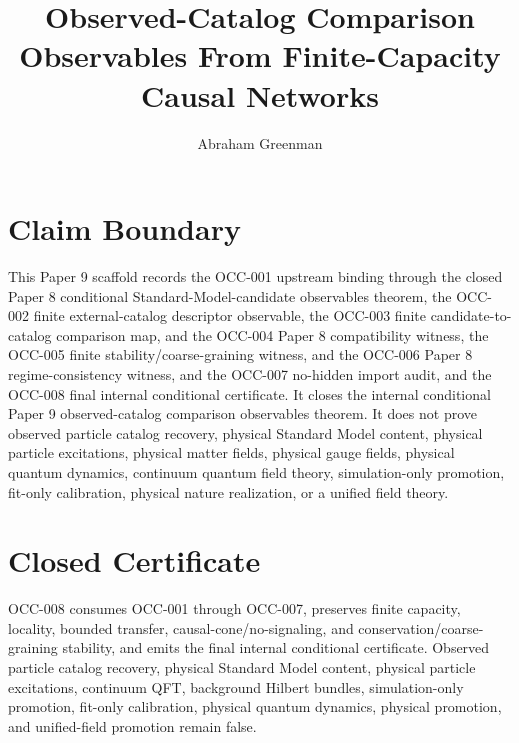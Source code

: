\documentclass{article}
\title{Observed-Catalog Comparison Observables From Finite-Capacity Causal Networks}
\author{Abraham Greenman}
\date{}
\begin{document}
\maketitle

\section{Claim Boundary}

This Paper 9 scaffold records the OCC-001 upstream binding through the closed
Paper 8 conditional Standard-Model-candidate observables theorem, the
OCC-002 finite external-catalog descriptor observable, the OCC-003 finite
candidate-to-catalog comparison map, and the OCC-004 Paper 8 compatibility
witness, the OCC-005 finite stability/coarse-graining witness, and the
OCC-006 Paper 8 regime-consistency witness, and the OCC-007 no-hidden import
audit, and the OCC-008 final internal conditional certificate. It closes the
internal conditional Paper 9 observed-catalog comparison observables theorem.
It does not prove observed particle catalog recovery, physical Standard Model
content, physical particle excitations, physical matter fields, physical
gauge fields, physical quantum dynamics, continuum quantum field theory,
simulation-only promotion, fit-only calibration, physical nature realization,
or a unified field theory.

\section{Closed Certificate}

OCC-008 consumes OCC-001 through OCC-007, preserves finite capacity,
locality, bounded transfer, causal-cone/no-signaling, and
conservation/coarse-graining stability, and emits the final internal
conditional certificate. Observed particle catalog recovery, physical
Standard Model content, physical particle excitations, continuum QFT,
background Hilbert bundles, simulation-only promotion, fit-only calibration,
physical quantum dynamics, physical promotion, and unified-field promotion
remain false.
\end{document}
